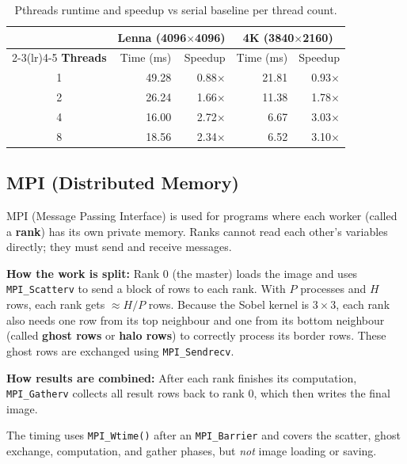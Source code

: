\documentclass[12pt,a4paper]{article}
\begin{document}
\begin{table}[H]
\centering\small
\begin{tabular}{@{}c rr rr@{}}
\toprule
 & \multicolumn{2}{c}{\textbf{Lenna (4096$\times$4096)}} &
   \multicolumn{2}{c}{\textbf{4K (3840$\times$2160)}} \\
\cmidrule(lr){2-3}\cmidrule(lr){4-5}
\textbf{Threads} & Time (ms) & Speedup & Time (ms) & Speedup \\
\midrule
1 & 49.28 & 0.88$\times$ & 21.81 & 0.93$\times$ \\
2 & 26.24 & 1.66$\times$ & 11.38 & 1.78$\times$ \\
4 & 16.00 & 2.72$\times$ & 6.67  & 3.03$\times$ \\
8 & 18.56 & 2.34$\times$ & 6.52  & 3.10$\times$ \\
\bottomrule
\end{tabular}
\caption{Pthreads runtime and speedup vs serial baseline per thread count.}
\label{tab:t_pthreads}
\end{table}

\subsection{MPI (Distributed Memory)}
\label{subsec:mpi}

MPI (Message Passing Interface) is used for programs where each worker
(called a \textbf{rank}) has its own private memory. Ranks cannot read each
other's variables directly; they must send and receive messages.

\textbf{How the work is split:} Rank 0 (the master) loads the image and uses
\texttt{MPI\_Scatterv} to send a block of rows to each rank. With $P$
processes and $H$ rows, each rank gets $\approx H/P$ rows. Because the Sobel
kernel is $3\times3$, each rank also needs one row from its top neighbour and
one from its bottom neighbour (called \textbf{ghost rows} or \textbf{halo
rows}) to correctly process its border rows. These ghost rows are exchanged
using \texttt{MPI\_Sendrecv}.

\textbf{How results are combined:} After each rank finishes its computation,
\texttt{MPI\_Gatherv} collects all result rows back to rank 0, which then
writes the final image.

The timing uses \texttt{MPI\_Wtime()} after an \texttt{MPI\_Barrier} and
covers the scatter, ghost exchange, computation, and gather phases, but
\emph{not} image loading or saving.
\end{document}
